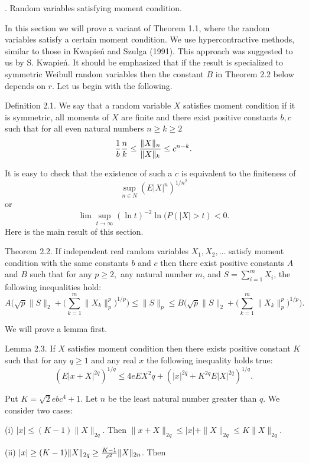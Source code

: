 . Random variables satisfying moment condition.

In this section we will prove a variant of Theorem 1.1, where the
random variables satisfy a certain moment condition.  
We use hypercontractive
methods, similar to those in Kwapie\'{n} and Szulga (1991).
This approach was suggested to us by S. Kwapie\'{n}. 
It should be emphasized that if the result is specialized to symmetric
Weibull random variables then the
constant $B$ in Theorem 2.2 below
depends on $r$.
Let us begin with the following.

\proclaim Definition 2.1. We say that a random variable $X$ satisfies
moment condition
if it is symmetric, all moments of $X$ are finite and there exist positive
constants
$b,c$ such that for all even natural numbers $n \geq k\ge2$
$$
{1\over b} {n\over k} \leq
{\| X \|_n\over\| X \|_{k}} \leq
c^{n-k}.
$$


\n It is easy to check that the existence of such a $c$ is equivalent to
the finiteness
of $$\sup_{n \in N} (E|X|^{n})^{1/n^{2}}$$ or $$\lim \sup_{t \to \infty}
(\ln t)^{-2} \ln (P(|X|>t)<0.$$ Here is the main result of this section.


\proclaim Theorem 2.2.
If independent real random variables $X_{1}, X_{2}, \ldots$ satisfy moment
condition with the same constants $b$ and $c$ then there exist positive
constants $A$ and $B$ such that for any $p \geq 2,$ any natural number $m$,
and
$S=\sum_{i=1}^{m} X_{i}$, the following inequalities hold: $$
A\Big(\sqrt{p} \| S \|_{2} +
\big(\sum_{k=1}^{m}\|X_{k}\|_p^{p}\big)^{1/p}\Big) \leq \| S \|_{p} \leq
B\Big(\sqrt{p} \| S \|_{2} + \big(\sum_{k=1}^{m}
\|X_{k}\|_p^{p}\big)^{1/p}\Big).
$$

\n We will prove a lemma first.

\proclaim Lemma 2.3.
If $X$ satisfies moment condition then there exists positive constant $K$
such that for any $q \geq 1$ and any real $x$ the following inequality
holds true:
$$
(E|x+X|^{2q})^{1/q} \leq
4e EX^{2} q + (|x|^{2q} + K^{2q} E|X|^{2q})^{1/q}. $$


\pf Put $K= \sqrt{2} ebc^{4} + 1$.
Let $n$ be the least natural number greater than $q$. We consider two cases:

\item{(i)} $|x| \leq (K-1) \| X \|_{2q}$. Then $\| x+X \|_{2q} \leq |x|+ \|
X \|_{2q} \leq K \| X \|_{2q}.$

\item{(ii)} $|x| \geq (K-1) \| X \|_{2q} \geq {K-1\over c^{2}} \| X
\|_{2n}$. Then

